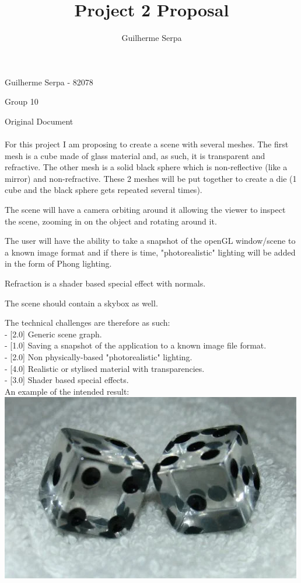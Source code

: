 \documentclass{article}
\title{Project 2 Proposal}
\author{Guilherme Serpa}
\begin{document}
\maketitle
\centerline{Guilherme Serpa - 82078}
\centerline{Group 10}

\newpage{}
Original Document\\\\
For this project I am proposing to create a scene with several meshes. The first mesh is a
cube made of glass material and, as such, it is transparent and refractive. The other mesh is
a solid black sphere which is non-reflective (like a mirror) and non-refractive.
These 2 meshes will be put together to create a die (1 cube and the black sphere gets repeated
several times).

The scene will have a camera orbiting around it allowing the viewer to inspect the scene, zooming
in on the object and rotating around it.

The user will have the ability to take a snapshot of the openGL window/scene to a known image format
and if there is time, "photorealistic" lighting will be added in the form of Phong lighting.

Refraction is a shader based special effect with normals.

The scene should contain a skybox as well.

The technical challenges are therefore as such: \\
- [2.0] Generic scene graph. \\
- [1.0] Saving a snapshot of the application to a known image file format. \\
- [2.0] Non physically-based "photorealistic" lighting. \\
- [4.0] Realistic or stylised material with transparencies. \\
- [3.0] Shader based special effects. \\

An example of the intended result:\\
\includegraphics[scale=0.5]{dice.jpg} \\
\end{document}
